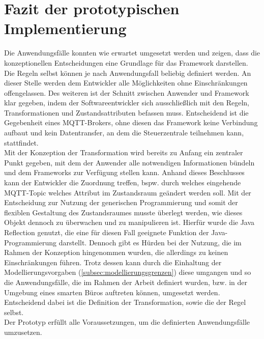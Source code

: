     \section{Fazit der prototypischen Implementierung}
        Die Anwendungsfälle konnten wie erwartet umgesetzt werden und zeigen, dass die konzeptionellen Entscheidungen eine Grundlage für das 
        Framework darstellen. Die Regeln selbst können je nach Anwendungsfall beliebig definiert werden. An dieser Stelle werden dem 
        Entwickler alle Möglichkeiten ohne Einschränkungen offengelassen. Des weiteren ist der Schnitt zwischen 
        Anwender und Framework klar gegeben, indem der Softwareentwickler sich ausschließlich mit den Regeln, Transformationen und Zustandsattributen 
        befassen muss. Entscheidend ist die Gegebenheit eines \acs{MQTT}-Brokers, ohne diesen das Framework keine Verbindung aufbaut und kein Datentransfer, an dem 
        die Steuerzentrale teilnehmen kann, stattfindet. 
        \\
        \linebreak
        Mit der Konzeption der Transformation wird bereits zu Anfang ein zentraler Punkt gegeben, mit dem der Anwender alle notwendigen Informationen 
        bündeln und dem Frameworks zur Verfügung stellen kann. Anhand dieses Beschlusses kann der Entwickler die Zuordnung treffen, bspw. durch welches 
        eingehende \acs{MQTT}-Topic welches Attribut im Zustandsraum geändert werden soll. Mit der Entscheidung zur Nutzung der generischen Programmierung 
        und somit der flexiblen Gestaltung des Zustandsraumes musste überlegt werden, wie dieses Objekt dennoch zu überwachen und zu manipulieren ist. 
        Hierfür wurde die Java Reflection genutzt, die eine für diesen Fall geeignete Funktion der Java-Programmierung darstellt. Dennoch gibt es Hürden bei der Nutzung, 
        die im Rahmen der Konzeption hingenommen wurden, die allerdings zu keinen Einschränkungen führen. Trotz dessen kann durch die Einhaltung 
        der Modellierungsvorgaben (\ref{subsec:modellierungsgrenzen}) diese umgangen und so die Anwendungsfälle, die im Rahmen der Arbeit 
        definiert wurden, bzw. in der Umgebung eines smarten Büros auftreten können, umgesetzt werden. Entscheidend dabei ist die Definition der 
        Transformation, sowie die der Regel selbst. 
        \\
        Der Prototyp erfüllt alle Voraussetzungen, um die definierten Anwendungsfälle umzusetzen.
    
